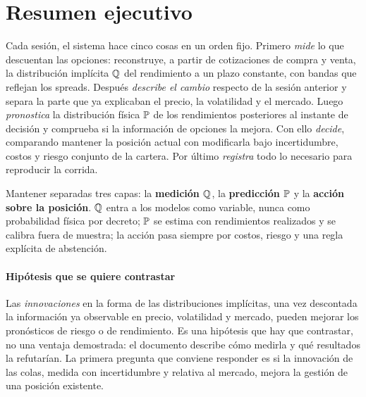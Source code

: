 \section*{Resumen ejecutivo}

Cada sesión, el sistema hace cinco cosas en un orden fijo. Primero \emph{mide} lo que descuentan
las opciones: reconstruye, a partir de cotizaciones de compra y venta, la distribución implícita
$\Q$ del rendimiento a un plazo constante, con bandas que reflejan los spreads. Después
\emph{describe el cambio} respecto de la sesión anterior y separa la parte que ya explicaban el
precio, la volatilidad y el mercado. Luego \emph{pronostica} la distribución física $\P$ de los
rendimientos posteriores al instante de decisión y comprueba si la información de opciones la
mejora. Con ello \emph{decide}, comparando mantener la posición actual con modificarla bajo
incertidumbre, costos y riesgo conjunto de la cartera. Por último \emph{registra} todo lo necesario
para reproducir la corrida.

\begin{ideaclave}
Mantener separadas tres capas: la \textbf{medición $\Q$}, la \textbf{predicción $\P$} y la
\textbf{acción sobre la posición}. $\Q$ entra a los modelos como variable, nunca como probabilidad
física por decreto; $\P$ se estima con rendimientos realizados y se calibra fuera de muestra; la
acción pasa siempre por costos, riesgo y una regla explícita de abstención.
\end{ideaclave}

\paragraph{Hipótesis que se quiere contrastar} Las \emph{innovaciones} en la forma de las
distribuciones implícitas, una vez descontada la información ya observable en precio, volatilidad y
mercado, pueden mejorar los pronósticos de riesgo o de rendimiento. Es una hipótesis que hay que
contrastar, no una ventaja demostrada: el documento describe cómo medirla y qué resultados la
refutarían. La primera pregunta que conviene responder es si la innovación de las colas, medida con
incertidumbre y relativa al mercado, mejora la gestión de una posición existente.

